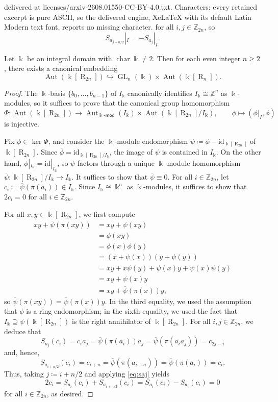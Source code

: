 \documentclass[10pt,a4paper]{amsart}
\newcommand{\Aut}{\operatorname{Aut}}
\newcommand{\GL}{\operatorname{GL}}
\newcommand{\R}{\operatorname{R}}
\newcommand{\Z}{\mathbb{Z}}
\newcommand{\chara}{\operatorname{char}}
\newcommand{\id}{\mathrm{id}}
\renewcommand{\k}{\Bbbk}
\begin{document}
delivered at licenses/arxiv-2608.01550-CC-BY-4.0.txt. Characters: every retained excerpt is pure ASCII, so the delivered engine, XeLaTeX with its default Latin Modern text font, reports no missing character.
    for all $i,j\in\Z_{2n}$, so \begin{equation}\label{eq:saj}
        S_{a_{j+n/2}}|_I=-S_{a_j}|_I.
    \end{equation}

\begin{theorem}\label{prop:embedding}
    Let $\k$ be an integral domain with $\chara\k\neq 2$. Then for each even integer $n\geq 2$, there exists a canonical embedding
    \[
    \Aut(\k[\R_{2n}])\hookrightarrow\GL_n(\k)\times\Aut(\k[\R_n]). 
    \]
\end{theorem}

\begin{proof}
    The $\k$-basis $\{b_0,\dots,b_{n-1}\}$ of $I_\k$ canonically identifies $I_\k\cong\Z^n$ as $\k$-modules, so it suffices to prove that the canonical group homomorphism
    \[
    \Phi\colon \Aut(\k[\R_{2n}])\to \Aut_{\k\text{-}\mathsf{mod}}(I_\k)\times \Aut(\k[\R_{2n}]/I_\k),\qquad\phi\mapsto(\phi|_I,\overline{\phi})
    \]
    is injective. 
    
    Fix $\phi\in\ker\Phi$, and consider the $\k$-module endomorphism $\psi\coloneq\phi-\id_{\k[\R_{2n}]}$ of $\k[\R_{2n}]$. Since $\overline{\phi}=\id_{\k[\R_{2n}]/I_\k}$, the image of $\psi$ is contained in $I_\k$. On the other hand, $\phi|_{I_\k}=\id|_{I_\k}$, so $\psi$ factors through a unique $\k$-module homomorphism $\overline{\psi}\colon\k[\R_{2n}]/I_\k\to I_\k$. 
    It suffices to show that $\overline\psi\equiv 0$. For all $i\in\Z_{2n}$, let $c_i\coloneq\overline\psi(\pi(a_i))\in I_\k$. Since $I_\k\cong\k^n$ as $\k$-modules, it suffices to show that $2c_i=0$ for all $i\in\Z_{2n}$. 
    
    For all $x,y\in\k[\R_{2n}]$, we first compute
    \begin{align*}
        xy+\overline\psi(\pi(xy))&=xy+\psi(xy)\\
        &=\phi(xy)\\
        &=\phi(x)\phi(y)\\
        &=(x+\psi(x))(y+\psi(y))\\
        &=xy+x\psi(y)+\psi(x)y+\psi(x)\psi(y)\\
        &=xy+\psi(x)y\\
        &=xy+\overline\psi(\pi(x))y,
    \end{align*}
    so $\overline\psi(\pi(xy))=\overline\psi(\pi(x))y$. In the third equality, we used the assumption that $\phi$ is a ring endomorphism; in the sixth equality, we used the fact that $I_\k\supseteq\psi(\k[\R_{2n}])$ is the right annihilator of $\k[\R_{2n}]$. For all $i,j\in\Z_{2n}$, we deduce that
    \[
    S_{a_j}(c_i)=c_ia_j=\overline\psi(\pi(a_i))a_j=\overline\psi(\pi(a_ia_j))=c_{2j-i}
    \]
    and, hence,
    \[
    S_{a_{i+n/2}}(c_i)=c_{i+n}=\overline\psi(\pi(a_{i+n}))=\overline\psi(\pi(a_i))=c_i.
    \]
    Thus, taking $j\coloneq i+n/2$ and applying \eqref{eq:saj} yields
    \[2c_i=S_{a_i}(c_i)+S_{a_{i+n/2}}(c_i)=S_{a_i}(c_i)-S_{a_i}(c_i)=0\]
    for all $i\in\Z_{2n}$, as desired.
\end{proof}
\end{document}
